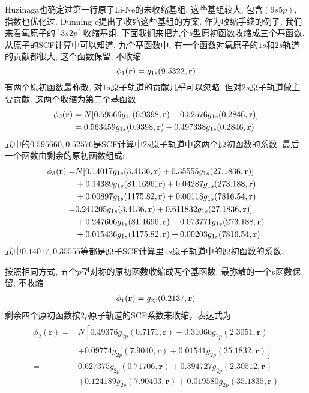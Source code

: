{Huzinaga也确定过第一行原子Li-Ne的未收缩基组, 这些基组较大, 包含$(9s5p)$, 指数也优化过. Dunning c提出了收缩这些基组的方案. 作为收缩手续的例子, 我们来看氧原子的$[3s2p]$收缩基组. 下面我们来把九个$s$型原初函数收缩成三个基函数. 从原子的SCF计算中可以知道, 九个基函数中, 有一个函数对氧原子的$1s$和$2s$轨道的贡献都很大, 这个函数保留, 不收缩.
\begin{equation}
\label{3.290}
\phi_1(\mathbf{r})=g_{1s}(9.5322,\mathbf{r})
\end{equation} 
有两个原初函数最弥散, 对$1s$原子轨道的贡献几乎可以忽略, 但对$2s$原子轨道做主要贡献. 这两个收缩为第二个基函数:
\begin{align}
\label{3.291}
\phi_2(\mathbf{r}) & = N[0.59566g_{1s}(0.9398,\mathbf{r}) + 0.52576 g_{1s}(0.2846,\mathbf{r})]\notag\\
			 & = 0.563459 g_{1s}(0.9398,\mathbf{r}) + 0.497338 g_{1s}(0.2846,\mathbf{r})
\end{align}
式中的$0.595660,0.52576$是SCF计算中$2s$原子轨道中这两个原初函数的系数. 最后一个函数由剩余的原初函数组成:
\begin{align}
\phi_3(\mathbf{r}) = &   N[0.14017g_{1s}(3.4136,\mathbf{r}) + 0.35555g_{1s}(27.1836,\mathbf{r})] \notag\\
               & + 0.14389g_{1s}(81.1696,\mathbf{r}) + 0.04287 g_{1s}(273.188,\mathbf{r}) \notag\\
               & + 0.00897g_{1s}(1175.82,\mathbf{r}) + 0.00118g_{1s}(7816.54,\mathbf{r}) \notag\\
             = & 0.241205g_{1s}(3.4136,\mathbf{r}) + 0.611832g_{1s}(27.1836,\mathbf{r})] \notag\\
             & + 0.247606g_{1s}(81.1696,\mathbf{r}) + 0.073771 g_{1s}(273.188,\mathbf{r}) \notag\\
             & + 0.015436g_{1s}(1175.82,\mathbf{r}) + 0.00203g_{1s}(7816.54,\mathbf{r})\\
\end{align}
式中$0.14017, 0.35555$等都是原子SCF计算里$1s$原子轨道中的原初函数的系数.

按照相同方式, 五个$p$型对称的原初函数收缩成两个基函数. 最弥散的一个$p$函数保留, 不收缩
\begin{align}
\phi_1(\mathbf{r}) = g_{2p}(0.2137,\mathbf{r})
\end{align}
剩余四个原初函数按$2p$原子轨道的SCF系数来收缩，表达式为
\begin{align}
\begin{aligned}
	\phi_{2}(\mathbf{r})=& N\left[0.49376 g_{2 p}(0.7171, \mathbf{r})+0.31066 g_{2 p}(2.3051, \mathbf{r})\right.\\
	&\left.+0.09774 g_{2 p}(7.9040, \mathbf{r})+0.01541 g_{2 p}(35.1832, \mathbf{r})\right] \\
	=& 0.627375 g_{2 p}(0.71706, \mathbf{r})+0.394727 g_{2 p}(2.30512, \mathbf{r}) \\
	&+0.124189 g_{2 p}(7.90403, \mathbf{r})+0.019580 g_{2 p}(35.1835, \mathbf{r})
\end{aligned}
\end{align}

}
